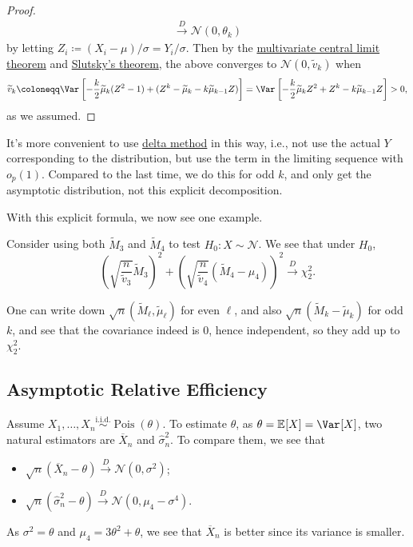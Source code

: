 \begin{proof}
\[\begin{split}
			\overset{D}{\to} \mathcal{N} (0, \theta_k)
		\end{split}
	\]
	by letting \(Z_i \coloneqq (X_i - \mu) / \sigma = Y_i / \sigma \). Then by the \hyperref[thm:multivariate-CLT]{multivariate central limit theorem} and \hyperref[col:Slutsky]{Slutsky's theorem}, the above converges to \(\mathcal{N} (0, \widetilde{v} _k)\) when
	\[
		\widetilde{v} _k
		\coloneqq \Var_{}\left[-\frac{k}{2} \widetilde{\mu} _k (Z^2 - 1) + (Z^k - \widetilde{\mu} _k - k \widetilde{\mu} _{k-1} Z ) \right]
		= \Var_{}\left[-\frac{k}{2} \widetilde{\mu} _k Z^2 + Z^k - k \widetilde{\mu} _{k-1} Z \right] > 0,
	\]
	as we assumed.
\end{proof}

\begin{note}
	It's more convenient to use \hyperref[thm:delta-method]{delta method} in this way, i.e., not use the actual \(Y\) corresponding to the distribution, but use the term in the limiting sequence with \(o_p(1)\). Compared to the last time, we do this for odd \(k\), and only get the asymptotic distribution, not this explicit decomposition.
\end{note}

With this explicit formula, we now see one example.

\begin{eg}
	Consider using both \(\widetilde{M} _3\) and \(\widetilde{M} _4\) to test \(H_0\colon X \sim \mathcal{N} \). We see that under \(H_0\),
	\[
		\left( \sqrt{\frac{n}{\widetilde{v} _3}} \widetilde{M} _3 \right) ^2 + \left( \sqrt{\frac{n}{\widetilde{v} _4}} (\widetilde{M} _4 - \mu _4) \right) ^2
		\overset{D}{\to} \chi _2^2 .
	\]
\end{eg}
\begin{explanation}
	One can write down \(\sqrt{n} (\widetilde{M} _\ell , \widetilde{\mu} _\ell )\) for even \(\ell \), and also \(\sqrt{n} (\widetilde{M} _k - \widetilde{\mu} _k)\) for odd \(k\), and see that the covariance indeed is \(0\), hence independent, so they add up to \(\chi _2^2\).
\end{explanation}

\subsection{Asymptotic Relative Efficiency}
Assume \(X_1, \dots , X_n \overset{\text{i.i.d.} }{\sim } \operatorname{Pois}(\theta ) \). To estimate \(\theta \), as \(\theta = \mathbb{E}_{}[X] = \Var_{}[X] \), two natural estimators are \(\overline{X} _n\) and \(\hat{\sigma} _n^2\). To compare them, we see that
\begin{itemize}
	\item \(\sqrt{n} (\overline{X} _n - \theta ) \overset{D}{\to} \mathcal{N} (0, \sigma ^2)\);
	\item \(\sqrt{n} (\hat{\sigma} _n^2 - \theta ) \overset{D}{\to} \mathcal{N} (0, \mu _4 - \sigma ^4)\).
\end{itemize}
As \(\sigma ^2 = \theta \) and \(\mu _4 = 3 \theta ^2 + \theta \), we see that \(\overline{X} _n\) is better since its variance is smaller.

